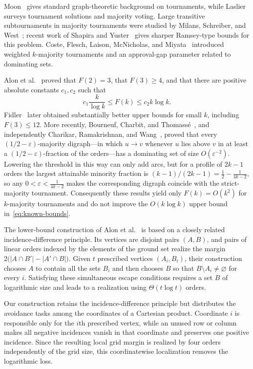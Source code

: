 \documentclass[12pt]{article}
\theoremstyle{remark}
\begin{document}
Moon~\cite{Moon} gives standard graph-theoretic background on
tournaments, while Laslier~\cite{Laslier} surveys tournament solutions
and majority voting.  Large transitive subtournaments in majority
tournaments were studied by Milans, Schreiber, and
West~\cite{MilansSchreiberWest}; recent work of Shapira and
Yuster~\cite{ShapiraYuster} gives sharper Ramsey-type bounds for this
problem.  Coste, Flesch, Laison, McNicholas, and
Miyata~\cite{CosteEtAl} introduced weighted $k$-majority tournaments and
an approval-gap parameter related to dominating sets.

Alon et al.~\cite{ABKKW} proved that $F(2)=3$, that $F(3)\ge 4$, and
that there are positive absolute constants $c_1,c_2$ such that
\begin{equation}\label{eq:known-bounds}
  c_1\frac{k}{\log k}\le F(k)\le c_2 k\log k.
\end{equation}
Fidler~\cite{Fidler} later obtained substantially better upper bounds for small $k$, including $F(3)\le 12$. More recently, Bourneuf, Charbit, and Thomassé~\cite{BCT}, and
independently Charikar, Ramakrishnan, and Wang~\cite{CRW}, proved that every $(1/2-\varepsilon)$-majority digraph---in which $u\to v$ whenever
$u$ lies above $v$ in at least a $(1/2-\varepsilon)$-fraction of the orders---has a dominating set of size $O(\varepsilon^{-2})$.  Lowering the threshold in this way can only add arcs, but for a profile of
$2k-1$ orders the largest attainable minority fraction is
$(k-1)/(2k-1)=\frac12-\frac{1}{4k-2}$, so any
$0<\varepsilon<\frac{1}{4k-2}$ makes the corresponding digraph coincide with the strict-majority tournament.  Consequently these results yield
only $F(k)=O(k^2)$ for $k$-majority tournaments and do not improve the $O(k\log k)$ upper bound in~\eqref{eq:known-bounds}.

The lower-bound construction of Alon et al.~\cite{ABKKW} is
based on a closely related incidence-difference principle.
Its vertices are disjoint pairs $(A,B)$, and pairs of linear
orders indexed by the elements of the ground set realize the
margin $2\bigl(|A\cap B'|-|A'\cap B|\bigr)$.
Given $t$ prescribed vertices $(A_i,B_i)$, their construction
chooses $A$ to contain all the sets $B_i$ and then chooses $B$
so that $B\setminus A_i\neq\varnothing$ for every $i$.
Satisfying these simultaneous escape conditions requires a set
$B$ of logarithmic size and leads to a realization using
$\Theta(t\log t)$ orders.

Our construction retains the incidence-difference principle but
distributes the avoidance tasks among the coordinates of a
Cartesian product.  Coordinate $i$ is responsible only for the
$i$th prescribed vertex, while an unused row or column makes all
negative incidences vanish in that coordinate and preserves one
positive incidence.  Since the resulting local grid margin is
realized by four orders independently of the grid size, this
coordinatewise localization removes the logarithmic loss.
\end{document}
